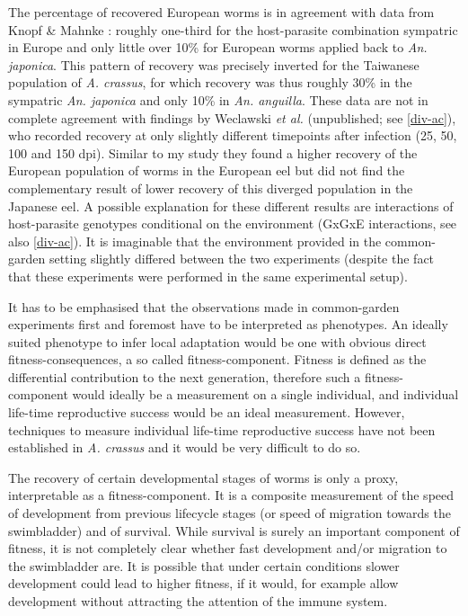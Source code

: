The percentage of recovered European worms is in agreement with data
from Knopf \& Mahnke \cite{knopf_differences_2004}: roughly one-third
for the host-parasite combination sympatric in Europe and only little
over 10\% for European worms applied back to
\textit{An. japonica}. This pattern of recovery was precisely inverted
for the Taiwanese population of \textit{A. crassus}, for which
recovery was thus roughly 30\% in the sympatric \textit{An. japonica}
and only 10\% in \textit{An. anguilla}. These data are not in complete
agreement with findings by Weclawski \textit{et al.} (unpublished; see
\ref{div-ac}), who recorded recovery at only slightly different
timepoints after infection (25, 50, 100 and 150 dpi). Similar to my
study they found a higher recovery of the European population of worms
in the European eel but did not find the complementary result of lower
recovery of this diverged population in the Japanese eel. A possible
explanation for these different results are interactions of
host-parasite genotypes conditional on the environment (GxGxE
interactions, see also \ref{div-ac}). It is imaginable that the
environment provided in the common-garden setting slightly differed
between the two experiments (despite the fact that these experiments
were performed in the same experimental setup).

It has to be emphasised that the observations made in common-garden
experiments first and foremost have to be interpreted as
phenotypes. An ideally suited phenotype to infer local adaptation
would be one with obvious direct fitness-consequences, a so called
fitness-component. Fitness is defined as the differential contribution
to the next generation, therefore such a fitness-component would
ideally be a measurement on a single individual, and individual
life-time reproductive success would be an ideal measurement. However,
techniques to measure individual life-time reproductive success have
not been established in \textit{A. crassus} and it would be very
difficult to do so.

The recovery of certain developmental stages of worms is only a proxy,
interpretable as a fitness-component. It is a composite measurement of
the speed of development from previous lifecycle stages (or speed of
migration towards the swimbladder) and of survival. While survival is
surely an important component of fitness, it is not completely clear
whether fast development and/or migration to the swimbladder are. It
is possible that under certain conditions slower development could
lead to higher fitness, if it would, for example allow development
without attracting the attention of the immune system.


